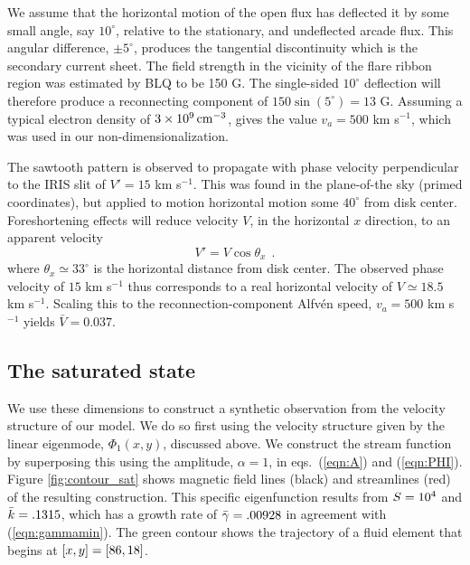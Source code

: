 	We assume that the horizontal motion of the open flux has deflected it by some small angle, say $10^{\circ}$, relative to the stationary, and undeflected arcade flux.  This angular difference, $\pm5^{\circ}$, produces the tangential discontinuity which is the secondary current sheet.  The field strength in the vicinity of the flare ribbon region was estimated by BLQ to be 150 G.  The single-sided  $10^{\circ}$ deflection will therefore produce a reconnecting component of $150\sin(5^{\circ})=13$ G.  Assuming a typical electron density of $3 \times 10^9\,{\rm cm^{-3}}$, gives the value $v_a = 500$ km s$^{-1}$, which was used in our non-dimensionalization.  
	
	The sawtooth pattern is observed to propagate with phase velocity perpendicular to the IRIS slit of $V' = 15$ km s$^{-1}$.
This was found in the plane-of-the sky (primed coordinates), but applied to motion horizontal motion some $40^{\circ}$ from disk center.  Foreshortening effects will reduce velocity $V$, in the horizontal $x$ direction, to an apparent velocity
	\begin{equation}
	\label{eqn:x_scale}
		V' = V\cos\theta_x~~.
	\end{equation}
where $\theta_x\simeq33^{\circ}$ is the horizontal distance from disk center.  The observed phase velocity of $15$ km s$^{-1}$ thus corresponds to a real horizontal velocity of $V \simeq 18.5 $ km s$^{-1}$.  Scaling this to the reconnection-component Alfv\'en speed, $v_a=500$ km s$^{-1}$ yields 
$\bar{V}=0.037$.  

\subsection{The saturated state}

We use these dimensions to construct a synthetic observation from the velocity structure of our model.  We do so first using the velocity structure given by the linear eigenmode, $\Phi_1(x,y)$, discussed above.  We construct the stream function by superposing this using the amplitude, $\alpha=1$, in eqs.\ (\ref{eqn:A}) and (\ref{eqn:PHI}).  Figure \ref{fig:contour_sat} shows magnetic field lines (black) and streamlines (red) of the resulting construction.  This specific eigenfunction results from $S=10^4$ and $\bar{k}=.1315$, which has a growth rate of $\bar{\gamma} = .00928$ in agreement with (\ref{eqn:gammamin}).  The green contour shows the trajectory of a fluid element that begins at $[x,y]=[86,18]$.
	

